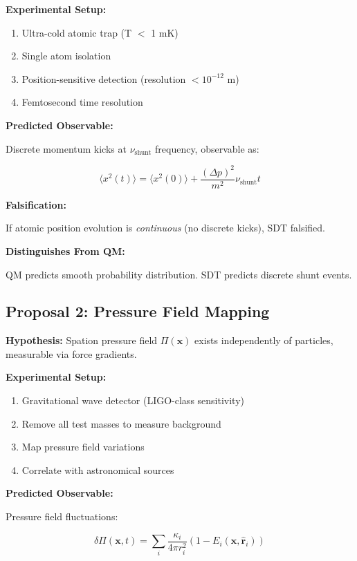 \textbf{Experimental Setup:}

\begin{enumerate}
\item Ultra-cold atomic trap (T $<$ 1 mK)
\item Single atom isolation
\item Position-sensitive detection (resolution $< 10^{-12}$ m)
\item Femtosecond time resolution
\end{enumerate}

\textbf{Predicted Observable:}

Discrete momentum kicks at $\nu_{\text{shunt}}$ frequency, observable as:

\begin{equation}
\langle x^2(t) \rangle = \langle x^2(0) \rangle + \frac{(\Delta p)^2}{m^2} \nu_{\text{shunt}} t
\end{equation}

\textbf{Falsification:}

If atomic position evolution is \emph{continuous} (no discrete kicks), SDT falsified.

\textbf{Distinguishes From QM:}

QM predicts smooth probability distribution. SDT predicts discrete shunt events.

\subsection{Proposal 2: Pressure Field Mapping}

\textbf{Hypothesis:} Spation pressure field $\Pi(\mathbf{x})$ exists independently of particles, measurable via force gradients.

\textbf{Experimental Setup:}

\begin{enumerate}
\item Gravitational wave detector (LIGO-class sensitivity)
\item Remove all test masses to measure background
\item Map pressure field variations
\item Correlate with astronomical sources
\end{enumerate}

\textbf{Predicted Observable:}

Pressure field fluctuations:

\begin{equation}
\delta \Pi(\mathbf{x}, t) = \sum_i \frac{\kappa_i}{4\pi r_i^2} \left(1 - E_i(\mathbf{x}, \hat{\mathbf{r}}_i)\right)
\end{equation}

